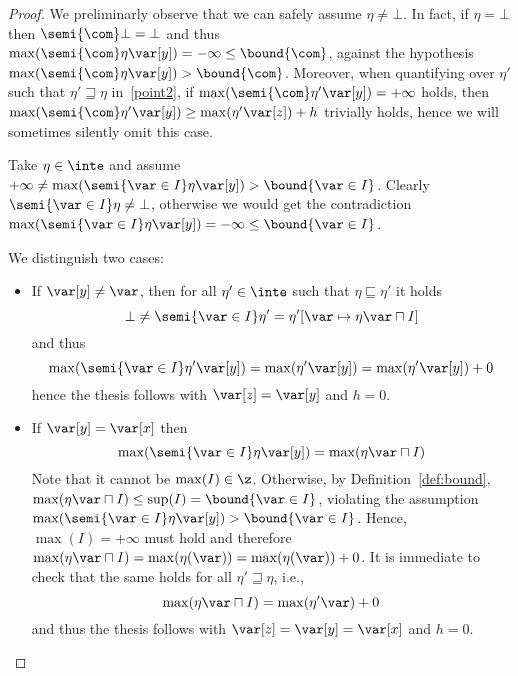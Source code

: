 \begin{proof}
  We preliminarly observe that we can safely assume
  \(\eta \neq \bot\).
  In fact, if \(\eta = \bot\) then \(\semi{\com} \bot = \bot\) and
  thus \(\max(\semi{\com} \eta \var[y]) = -\infty \leq \bound{\com}\),
  against the hypothesis
  \(\max(\semi{\com}\eta \var[y]) > \bound{\com}\). Moreover, when
  quantifying over \(\eta'\) such that \(\eta' \sqsupseteq \eta\)
  in~\ref{point2}, if \(\max(\semi{\com}\eta' \var[y]) = + \infty\)
  holds, then
  \(\max(\semi{\com}\eta' \var[y]) \geq \max(\eta' \var[z]) + h\)
  trivially holds, hence we will sometimes silently omit this case.
  \begin{inductive}
    Take \(\eta \in \inte\) and assume
    \(+\infty\neq\max(\semi{\var \in I}\eta \var[y]) > \bound{\var \in I}\).
    Clearly \(\semi{\var \in I}\eta \neq \bot\), otherwise we would get
    the contradiction
    \(\max(\semi{\var \in I}\eta \var[y]) = -\infty \leq \bound{\var \in
      I}\).
    
    We distinguish two cases:
    \begin{itemize}
      
    \item If \(\var[y] \neq \var\), then for all \(\eta' \in \inte\) such
      that \(\eta \sqsubseteq \eta'\) it holds
      \[\bot \neq \semi{\var \in I}\eta' = \eta'[\var \mapsto
        {\eta\var\sqcap I}]\]
      and thus
      \begin{equation*}
        \max(\semi{\var \in I}\eta' \var[y]) = \max(\eta' \var[y]) = \max(\eta' \var[y]) + 0
      \end{equation*}
      hence the thesis follows with \(\var[z]=\var[y]\) and \(h = 0\).

    \item If \(\var[y] = \var[x]\) then
      \begin{equation*}
        \max(\semi{\var \in I}\eta \var[y]) = \max({\eta\var\sqcap I})
      \end{equation*}
      Note that it cannot be \(\max(I)\in \z\). Otherwise, by
      Definition~\ref{def:bound},
      \(\max ({\eta\var\sqcap I}) \leq \sup(I)= \bound{\var \in I}\),
      violating the assumption
      \(\max(\semi{\var \in I}\eta \var[y]) > \bound{\var \in I}\).
      Hence, \(\max(I) = +\infty\) must hold and therefore %
      \(\max ({\eta\var\sqcap I}) = \max(\eta(\var)) =
      \max(\eta(\var)) + 0\). It is immediate to check that the same
      holds for all \(\eta' \sqsupseteq \eta\), i.e.,
      \begin{equation*}
        \max({\eta\var\sqcap I}) = \max(\eta'\var) + 0
      \end{equation*}
      and thus the thesis follows with  \(\var[z]=\var[y]=\var[x]\) and \(h=0\).
    \end{itemize}  
    

\end{inductive}
\end{proof}
